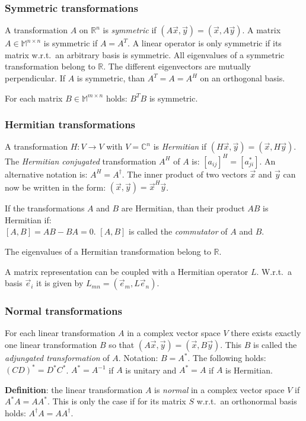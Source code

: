\subsubsection{Symmetric transformations}
A transformation $A$ on $ \mathbb{R}^n$ is {\it symmetric} if
$(A\vec{x},\vec{y})=(\vec{x},A\vec{y})$. A matrix $A\in\mathbb{M}^{n\times n}$
is symmetric if $A=A^T$. A linear operator is only symmetric if its matrix
w.r.t.\ an arbitrary basis is symmetric. All eigenvalues of a symmetric
transformation belong to $ \mathbb{R}$. The different eigenvectors are mutually
perpendicular. If $A$ is symmetric, than $A^T=A=A^H$ on an orthogonal basis.
 
For each matrix $B\in\mathbb{M}^{m\times n}$ holds: $B^TB$ is symmetric.

\subsubsection{Hermitian transformations}
A transformation $H:V\rightarrow V$ with $V=\mathbb{C}^n$ is {\it Hermitian} if
$(H\vec{x},\vec{y})=(\vec{x},H\vec{y})$. The {\it Hermitian conjugated}
transformation $A^H$ of $A$ is: $[a_{ij}]^H=[a_{ji}^*]$. An alternative
notation is: $A^H=A^\dagger$. The inner product of two vectors $\vec{x}$ and
$\vec{y}$ can now be written in the form: $(\vec{x},\vec{y})=\vec{x}^H\vec{y}$.
 
If the transformations $A$ and $B$ are Hermitian, than their product $AB$ is
Hermitian if:\\ $[A,B]=AB-BA=0$. $[A,B]$ is called the {\it commutator} of $A$
and $B$.
 
The eigenvalues of a Hermitian transformation belong to $ \mathbb{R}$.
 
A matrix representation can be coupled with a Hermitian operator $L$.
W.r.t.\ a basis $\vec{e}_i$ it is given by $L_{mn}=(\vec{e}_m,L\vec{e}_n)$.

\subsubsection{Normal transformations}
For each linear transformation $A$ in a complex vector space $V$ there exists
exactly one linear transformation $B$ so that $(A\vec{x},\vec{y})=(\vec{x},B\vec{y})$.
This $B$ is called the {\it adjungated transformation} of $A$. Notation:
$B=A^*$.  The following holds: $(CD)^*=D^*C^*$. $A^*=A^{-1}$ if $A$ is unitary
and $A^*=A$ if $A$ is Hermitian.
 
{\bf Definition}: the linear transformation $A$ is {\it normal} in a complex
vector space $V$ if $A^*A=AA^*$. This is only the case if for its matrix $S$
w.r.t.\ an orthonormal basis holds: $A^\dagger A=AA^\dagger$.
 
